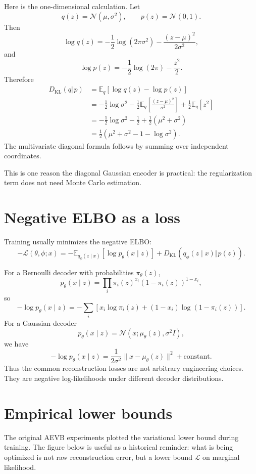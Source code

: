 Here is the one-dimensional calculation.  Let
\[
  q(z)=\mathcal N(\mu,\sigma^2),\qquad p(z)=\mathcal N(0,1).
\]
Then
\[
  \log q(z)=-\frac12\log(2\pi\sigma^2)-\frac{(z-\mu)^2}{2\sigma^2},
\]
and
\[
  \log p(z)=-\frac12\log(2\pi)-\frac{z^2}{2}.
\]
Therefore
\[
\begin{aligned}
D_{\mathrm{KL}}(q\Vert p)
&=\mathbb E_q[\log q(z)-\log p(z)]\\
&= -\frac12\log\sigma^2
-\frac12\mathbb E_q\left[\frac{(z-\mu)^2}{\sigma^2}\right]
+\frac12\mathbb E_q[z^2]\\
&= -\frac12\log\sigma^2-\frac12+\frac12(\mu^2+\sigma^2)\\
&=\frac12(\mu^2+\sigma^2-1-\log\sigma^2).
\end{aligned}
\]
The multivariate diagonal formula follows by summing over independent coordinates.

This is one reason the diagonal Gaussian encoder is practical: the regularization term does not need Monte Carlo estimation.

\section{Negative ELBO as a loss}

Training usually minimizes the negative ELBO:
\[
  -\mathcal L(\theta,\phi;x)
  =-\mathbb E_{q_\phi(z\mid x)}[\log p_\theta(x\mid z)]
  +D_{\mathrm{KL}}(q_\phi(z\mid x)\Vert p(z)).
\]

For a Bernoulli decoder with probabilities \(\pi_\theta(z)\),
\[
  p_\theta(x\mid z)=\prod_i \pi_i(z)^{x_i}(1-\pi_i(z))^{1-x_i},
\]
so
\[
  -\log p_\theta(x\mid z)
  =-\sum_i\left[x_i\log\pi_i(z)+(1-x_i)\log(1-\pi_i(z))\right].
\]
For a Gaussian decoder
\[
  p_\theta(x\mid z)=\mathcal N(x;\mu_\theta(z),\sigma^2I),
\]
we have
\[
  -\log p_\theta(x\mid z)
  =\frac{1}{2\sigma^2}\|x-\mu_\theta(z)\|^2+\text{constant}.
\]
Thus the common reconstruction losses are not arbitrary engineering choices.  They are negative log-likelihoods under different decoder distributions.

\section{Empirical lower bounds}

The original AEVB experiments plotted the variational lower bound during training.  The figure below is useful as a historical reminder: what is being optimized is not raw reconstruction error, but a lower bound \(\mathcal L\) on marginal likelihood.


